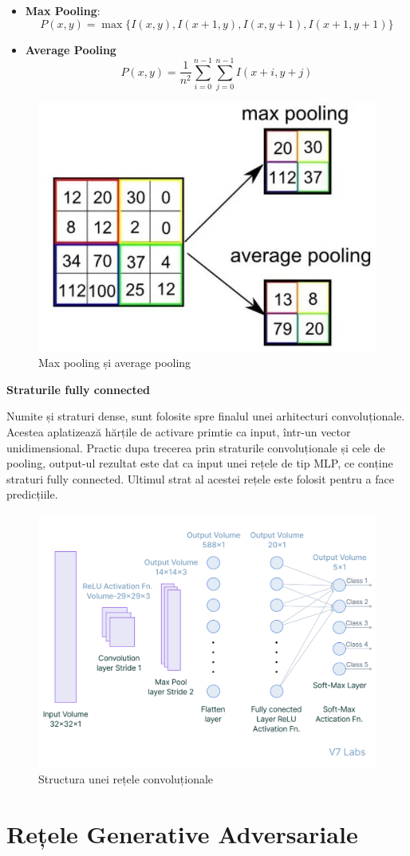 \begin{itemize}
    \item \textbf{Max Pooling}:
        \begin{equation}
            P(x, y) = \max \{ I(x, y), I(x+1, y), I(x, y+1), I(x+1, y+1) \}
        \end{equation}
    \item \textbf{Average Pooling}
        \begin{equation}
            P(x, y) = \frac{1}{n^2} \sum_{i=0}^{n-1} \sum_{j=0}^{n-1} I(x+i, y+j)
        \end{equation}
    
\end{itemize}
\newpage
\begin{figure}[h]
         \centering 
         \includegraphics[width=0.55\linewidth]{images/pooling.jpg}
         \captionsetup{font=footnotesize}
         \caption{Max pooling și average pooling\cite{pooling}}
\end{figure}

\textbf{Straturile fully connected}

Numite și straturi dense, sunt folosite spre finalul unei arhitecturi convoluționale. Acestea aplatizează hărțile de activare primtie ca input, într-un vector unidimensional. Practic dupa trecerea prin straturile convoluționale și cele de pooling, output-ul rezultat este dat ca input unei rețele de tip MLP, ce conține straturi fully connected. Ultimul strat al acestei rețele este folosit pentru a face predicțiile.

\begin{figure}[ht]
         \centering 
         \includegraphics[width=0.65\linewidth]{images/Fully connected.png}
         \captionsetup{font=footnotesize}
         \caption{Structura unei rețele convoluționale\cite{fully-connected}}
\end{figure}

\section{Rețele Generative Adversariale}

